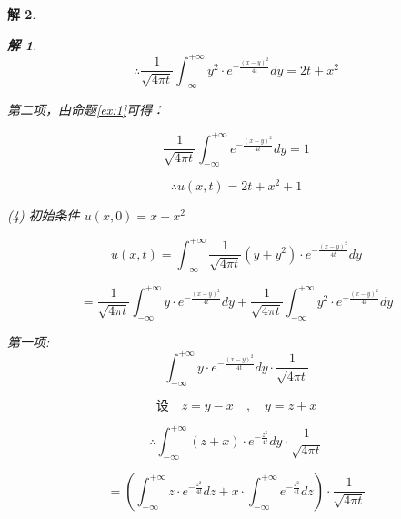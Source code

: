 \documentclass[12pt,a4paper]{article}
\newtheorem*{solution}{解}
\begin{document}
\begin{solution}
\begin{solution}
\begin{equation*}
	\therefore \frac{1}{\sqrt{4\pi t}}\int_{-\infty}^{+\infty} y^2 \cdot e^{-\frac{(x-y)^2}{4t}} dy=2t+x^2
\end{equation*}

第二项，由命题\eqref{ex:1}可得：

\begin{equation*}
	\frac{1}{\sqrt{4\pi t}}\int_{-\infty}^{+\infty} e^{-\frac{(x-y)^2}{4t}} dy=1
\end{equation*}
	
	\begin{equation*}
		\therefore u(x,t) = 2t + x^2 + 1
	\end{equation*}
	
	
	
\end{solution}
	
	
(4) 初始条件 \( u(x,0) = x + x^2 \)
	
\begin{equation*}
 u(x,t) = \int_{-\infty}^{+\infty} \frac{1}{\sqrt{4\pi t}} (y + y^2) \cdot e^{-\frac{(x-y)^2}{4t}} dy
\end{equation*}

\begin{equation*}
	= \frac{1}{\sqrt{4\pi t}} \int_{-\infty}^{+\infty} y \cdot e^{-\frac{(x-y)^2}{4t}} dy + \frac{1}{\sqrt{4\pi t}} \int_{-\infty}^{+\infty} y^2 \cdot e^{-\frac{(x-y)^2}{4t}} dy
\end{equation*}

第一项:
\begin{equation*}
	\int_{-\infty}^{+\infty} y \cdot e^{-\frac{(x-y)^2}{4t}} dy \cdot \frac{1}{\sqrt{4\pi t}}
\end{equation*}

\begin{equation*}
	\text{设} \quad z = y - x \quad , \quad y = z + x
\end{equation*}

\begin{equation*}
	\therefore \int_{-\infty}^{+\infty} (z + x) \cdot e^{-\frac{z^2}{4t}} dy \cdot \frac{1}{\sqrt{4\pi t}}
\end{equation*}

\begin{equation*}
	= \left( \int_{-\infty}^{+\infty} z \cdot e^{-\frac{z^2}{4t}} dz + x \cdot \int_{-\infty}^{+\infty} e^{-\frac{z^2}{4t}} dz \right) \cdot \frac{1}{\sqrt{4\pi t}}
\end{equation*}


\end{solution}
\end{document}
